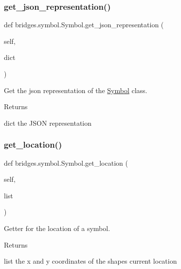 \subsubsection{\texorpdfstring{get\+\_\+json\+\_\+representation()}{get\_json\_representation()}}
{\footnotesize\ttfamily def bridges.\+symbol.\+Symbol.\+get\+\_\+json\+\_\+representation (\begin{DoxyParamCaption}\item[{}]{self,  }\item[{}]{dict }\end{DoxyParamCaption})}



Get the json representation of the \mbox{\hyperlink{classbridges_1_1symbol_1_1_symbol}{Symbol}} class. 

\begin{DoxyReturn}{Returns}


dict the J\+S\+ON representation 
\end{DoxyReturn}
\mbox{\label{classbridges_1_1symbol_1_1_symbol_a8abbc9a5c77eb7e2ef40338102a145c4}} 
\subsubsection{\texorpdfstring{get\+\_\+location()}{get\_location()}}
{\footnotesize\ttfamily def bridges.\+symbol.\+Symbol.\+get\+\_\+location (\begin{DoxyParamCaption}\item[{}]{self,  }\item[{}]{list }\end{DoxyParamCaption})}



Getter for the location of a symbol. 

\begin{DoxyReturn}{Returns}


list the x and y coordinates of the shape\textquotesingle{}s current location 
\end{DoxyReturn}
\mbox{\label{classbridges_1_1symbol_1_1_symbol_ab6701b43acd3e24077b1bc385b35fdf1}} 
